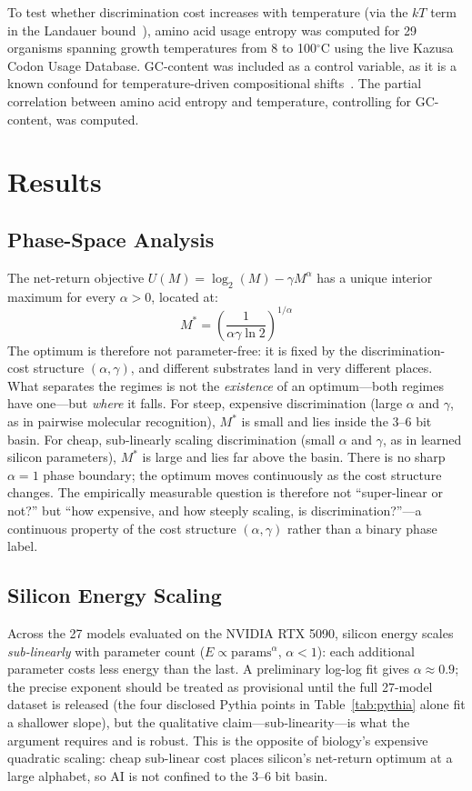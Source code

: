 \documentclass[11pt]{article}
\begin{document}
To test whether discrimination cost increases with temperature (via the $kT$ term in the Landauer bound~\cite{landauer1961}), amino acid usage entropy was computed for 29 organisms spanning growth temperatures from 8 to 100$^\circ$C using the live Kazusa Codon Usage Database. GC-content was included as a control variable, as it is a known confound for temperature-driven compositional shifts~\cite{zeldovich2007}. The partial correlation between amino acid entropy and temperature, controlling for GC-content, was computed.

\section{Results}

\subsection{Phase-Space Analysis}

The net-return objective $U(M)=\log_2(M)-\gamma M^\alpha$ has a unique interior maximum for every $\alpha>0$, located at:
\begin{equation}
M^* = \left(\frac{1}{\alpha \gamma \ln 2}\right)^{1/\alpha}
\end{equation}
The optimum is therefore not parameter-free: it is fixed by the discrimination-cost structure $(\alpha,\gamma)$, and different substrates land in very different places. What separates the regimes is not the \emph{existence} of an optimum---both regimes have one---but \emph{where} it falls. For steep, expensive discrimination (large $\alpha$ and $\gamma$, as in pairwise molecular recognition), $M^*$ is small and lies inside the 3--6 bit basin. For cheap, sub-linearly scaling discrimination (small $\alpha$ and $\gamma$, as in learned silicon parameters), $M^*$ is large and lies far above the basin. There is no sharp $\alpha=1$ phase boundary; the optimum moves continuously as the cost structure changes. The empirically measurable question is therefore not ``super-linear or not?'' but ``how expensive, and how steeply scaling, is discrimination?''---a continuous property of the cost structure $(\alpha,\gamma)$ rather than a binary phase label.

\subsection{Silicon Energy Scaling}

Across the 27 models evaluated on the NVIDIA RTX 5090, silicon energy scales \emph{sub-linearly} with parameter count ($E \propto \mathrm{params}^{\alpha}$, $\alpha < 1$): each additional parameter costs less energy than the last. A preliminary log-log fit gives $\alpha \approx 0.9$; the precise exponent should be treated as provisional until the full 27-model dataset is released (the four disclosed Pythia points in Table~\ref{tab:pythia} alone fit a shallower slope), but the qualitative claim---sub-linearity---is what the argument requires and is robust. This is the opposite of biology's expensive quadratic scaling: cheap sub-linear cost places silicon's net-return optimum at a large alphabet, so AI is not confined to the 3--6 bit basin.
\end{document}

